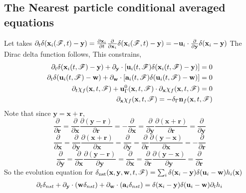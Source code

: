 \documentclass[11pt]{My_preprint}
\begin{document}
\subsection*{The Nearest particle conditional averaged equations}
Let takes 
$\partial_t \delta(\textbf{x}_i(\mathscr{F},t) - \textbf{y}) 
= \frac{\partial \textbf{x}_i}{\partial t} \frac{\partial }{\partial \textbf{x}_i} \delta(\textbf{x}_i(\mathscr{F},t) - \textbf{y})
= - \textbf{u}_i \cdot \frac{\partial }{\partial \textbf{y}} \delta(\textbf{x}_i - \textbf{y})$
The Dirac delta function follows, This constrains,
\begin{align*}
    \partial_t \delta(\textbf{x}_i(t,\mathscr{F})  - \textbf{y})
    + {\partial_\textbf{y}} \cdot [\textbf{u}_i(t,\mathscr{F})  \delta(\textbf{x}_i(t,\mathscr{F})  - \textbf{y})]
    = 0\\
    \partial_t \delta(\textbf{u}_i(t,\mathscr{F}) -\textbf{w})
    + {\partial_\textbf{w}} \cdot [\textbf{a}_i(t,\mathscr{F})  \delta(\textbf{u}_i(t,\mathscr{F})  - \textbf{w})]
    = 0\\
    \partial_t \chi_f(\textbf{x},t,\mathscr{F}) 
    + \textbf{u}_\Gamma^0(\textbf{x},t,\mathscr{F}) \cdot {\partial_\textbf{x}} \chi_f(\textbf{x},t,\mathscr{F}) = 0 \\
    {\partial_\textbf{x}} \chi_f(\textbf{x},t,\mathscr{F}) = - \delta_\Gamma \textbf{n}_f(\textbf{x},t,\mathscr{F})
\end{align*}
Note that since $\textbf{y} = \textbf{x} + \textbf{r}$, 
\begin{equation*}
    \frac{\partial }{\partial \textbf{r}}
    = \frac{\partial }{\partial \textbf{x}}
    \frac{\partial (\textbf{y} - \textbf{r})}{\partial \textbf{r}}
    = - \frac{\partial }{\partial \textbf{x}}
    = \frac{\partial }{\partial \textbf{y}}
    \frac{\partial (\textbf{x} + \textbf{r})}{\partial \textbf{r}}
    = \frac{\partial }{\partial \textbf{y}}
\end{equation*}
\begin{equation*}
    \frac{\partial }{\partial \textbf{x}}
    = \frac{\partial }{\partial \textbf{y}}
    \frac{\partial (\textbf{x} + \textbf{r})}{\partial \textbf{x}}
    = \frac{\partial }{\partial \textbf{y}}
    = \frac{\partial }{\partial \textbf{r}}
    \frac{\partial (\textbf{y} - \textbf{x})}{\partial \textbf{x}}
    = - \frac{\partial }{\partial \textbf{r}}
\end{equation*}
\begin{equation*}
    \frac{\partial }{\partial \textbf{y}}
    = \frac{\partial }{\partial \textbf{x}}
    \frac{\partial (\textbf{y} - \textbf{r})}{\partial \textbf{y}}
    = \frac{\partial }{\partial \textbf{x}}
    = \frac{\partial }{\partial \textbf{r}}
    \frac{\partial (\textbf{y} - \textbf{x})}{\partial \textbf{y}}
    = \frac{\partial }{\partial \textbf{r}}
\end{equation*}
So the evolution equation for 
$\delta_\text{nst}(\textbf{x},\textbf{y},\textbf{w},t,\mathscr{F}) =  \sum_i \delta(\textbf{x}_i -\textbf{y}) \delta(\textbf{u}_i - \textbf{w}) h_i(\textbf{x})$
\begin{align*}
    \partial_t \delta_{nst}
    + {\partial_\textbf{y}} \cdot (\textbf{w} \delta_{nst})
    + {\partial_\textbf{w}} \cdot (\textbf{a}_i  \delta_{nst})
    = 
    \delta(\textbf{x}_i -\textbf{y}) \delta(\textbf{u}_i - \textbf{w}) \partial_t h_i
\end{align*}
\end{document}

